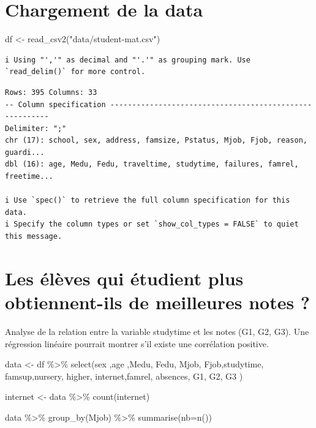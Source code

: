 \documentclass[
  letterpaper,
  DIV=11,
  numbers=noendperiod]{scrartcl}
\newenvironment{Shaded}{\begin{snugshade}}{\end{snugshade}}
\newcommand{\AttributeTok}[1]{\textcolor[rgb]{0.40,0.45,0.13}{#1}}
\newcommand{\FunctionTok}[1]{\textcolor[rgb]{0.28,0.35,0.67}{#1}}
\newcommand{\NormalTok}[1]{\textcolor[rgb]{0.00,0.23,0.31}{#1}}
\newcommand{\OtherTok}[1]{\textcolor[rgb]{0.00,0.23,0.31}{#1}}
\newcommand{\SpecialCharTok}[1]{\textcolor[rgb]{0.37,0.37,0.37}{#1}}
\newcommand{\StringTok}[1]{\textcolor[rgb]{0.13,0.47,0.30}{#1}}
\begin{document}
\section{Chargement de la data}\label{chargement-de-la-data}

\begin{Shaded}
\begin{Highlighting}[]
\NormalTok{df }\OtherTok{\textless{}{-}} \FunctionTok{read\_csv2}\NormalTok{(}\StringTok{"data/student{-}mat.csv"}\NormalTok{)}
\end{Highlighting}
\end{Shaded}

\begin{verbatim}
i Using "','" as decimal and "'.'" as grouping mark. Use `read_delim()` for more control.
\end{verbatim}

\begin{verbatim}
Rows: 395 Columns: 33
-- Column specification --------------------------------------------------------
Delimiter: ";"
chr (17): school, sex, address, famsize, Pstatus, Mjob, Fjob, reason, guardi...
dbl (16): age, Medu, Fedu, traveltime, studytime, failures, famrel, freetime...

i Use `spec()` to retrieve the full column specification for this data.
i Specify the column types or set `show_col_types = FALSE` to quiet this message.
\end{verbatim}

\section{Les élèves qui étudient plus obtiennent-ils de meilleures notes
?}\label{les-uxe9luxe8ves-qui-uxe9tudient-plus-obtiennent-ils-de-meilleures-notes}

Analyse de la relation entre la variable studytime et les notes (G1, G2,
G3). Une régression linéaire pourrait montrer s'il existe une
corrélation positive.

\begin{Shaded}
\begin{Highlighting}[]
\NormalTok{data }\OtherTok{\textless{}{-}}\NormalTok{ df }\SpecialCharTok{\%\textgreater{}\%} \FunctionTok{select}\NormalTok{(sex ,age ,Medu, Fedu, Mjob, Fjob,studytime, famsup,nursery, higher, internet,famrel, absences, G1, G2, G3 )}

\NormalTok{internet }\OtherTok{\textless{}{-}}\NormalTok{ data }\SpecialCharTok{\%\textgreater{}\%} \FunctionTok{count}\NormalTok{(internet)}

\NormalTok{data }\SpecialCharTok{\%\textgreater{}\%} 
  \FunctionTok{group\_by}\NormalTok{(Mjob) }\SpecialCharTok{\%\textgreater{}\%}
  \FunctionTok{summarise}\NormalTok{(}\AttributeTok{nb=}\FunctionTok{n}\NormalTok{())}
\end{Highlighting}
\end{Shaded}
\end{document}
